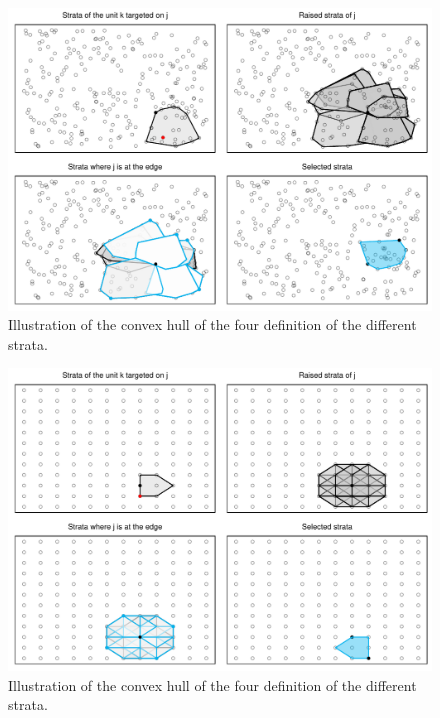 \documentclass[12pt,english]{article}\usepackage[]{graphicx}\usepackage{xcolor}
\makeatletter
\def\maxwidth{ %
  \ifdim\Gin@nat@width>\linewidth
    \linewidth
  \else
    \Gin@nat@width
  \fi
}
\newenvironment{knitrout}{}{} %
\makeatother
\begin{document}
\begin{knitrout}
\color{fgcolor}\begin{figure}
\includegraphics[width=\maxwidth]{figure/image-all_strata-1} \caption[Illustration of the convex hull of the four definition of the different strata]{Illustration of the convex hull of the four definition of the different strata.}\label{fig:all_strata}
\end{figure}


\end{knitrout}









\begin{knitrout}
\color{fgcolor}\begin{figure}
\includegraphics[width=\maxwidth]{figure/image-all_stratagrid-1} \caption[Illustration of the convex hull of the four definition of the different strata]{Illustration of the convex hull of the four definition of the different strata.}\label{fig:all_stratagrid}
\end{figure}


\end{knitrout}
\end{document}
